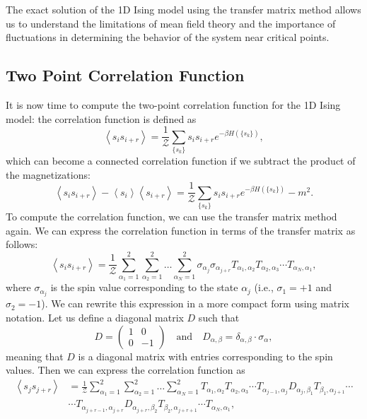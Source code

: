 The exact solution of the 1D Ising model using the transfer matrix method allows us to understand the limitations of mean field theory and the importance of fluctuations in determining the behavior of the system near critical points.

\subsection{Two Point Correlation Function}

It is now time to compute the two-point correlation function for the 1D Ising model: the correlation function is defined as
\[
    \left\langle s_i s_{i+r} \right\rangle = \frac{1}{\mathcal{Z}} \sum_{\{s_k\}} s_i s_{i+r} e^{-\beta H(\{s_k\})},
\]
which can become a connected correlation function if we subtract the product of the magnetizations:
\[
    \left\langle s_i s_{i+r} \right\rangle - \left\langle s_i \right\rangle \left\langle s_{i+r} \right\rangle = \frac{1}{\mathcal{Z}} \sum_{\{s_k\}} s_i s_{i+r} e^{-\beta H(\{s_k\})} - m^2.
\]
To compute the correlation function, we can use the transfer matrix method again. We can express the correlation function in terms of the transfer matrix as follows:
\[
    \left\langle s_i s_{i+r} \right\rangle = \frac{1}{\mathcal{Z}} \sum_{\alpha_1=1}^2 \sum_{\alpha_2=1}^2 \dots \sum_{\alpha_N=1}^2 \sigma_{\alpha_j} \sigma_{\alpha_{j+r}} T_{\alpha_1, \alpha_2} T_{\alpha_2, \alpha_3} \cdots T_{\alpha_N, \alpha_1},
\]
where \(\sigma_{\alpha_j}\) is the spin value corresponding to the state \(\alpha_j\) (i.e., \(\sigma_1 = +1\) and \(\sigma_2 = -1\)). We can rewrite this expression in a more compact form using matrix notation. Let us define a diagonal matrix \(D\) such that
\[
    D = \begin{pmatrix}
        1 & 0  \\
        0 & -1
    \end{pmatrix} \quad \text{and} \quad D_{\alpha,\beta} = \delta_{\alpha,\beta} \cdot \sigma_{\alpha},
\]
meaning that \(D\) is a diagonal matrix with entries corresponding to the spin values. Then we can express the correlation function as
\[
    \begin{aligned}
        \left\langle s_j s_{j+r} \right\rangle & = \frac{1}{\mathcal{Z}} \sum_{\alpha_1=1}^2 \sum_{\alpha_2=1}^2 \dots \sum_{\alpha_N=1}^2 T_{\alpha_1, \alpha_2} T_{\alpha_2, \alpha_3} \cdots T_{\alpha_{j-1}, \alpha_j} D_{\alpha_j, \beta_1} T_{\beta_1, \alpha_{j+1}} \cdots \\
                                               & \cdots T_{\alpha_{j+r-1}, \alpha_{j+r}} D_{\alpha_{j+r}, \beta_2} T_{\beta_2, \alpha_{j+r+1}} \cdots T_{\alpha_N, \alpha_1},
    \end{aligned}
\]
